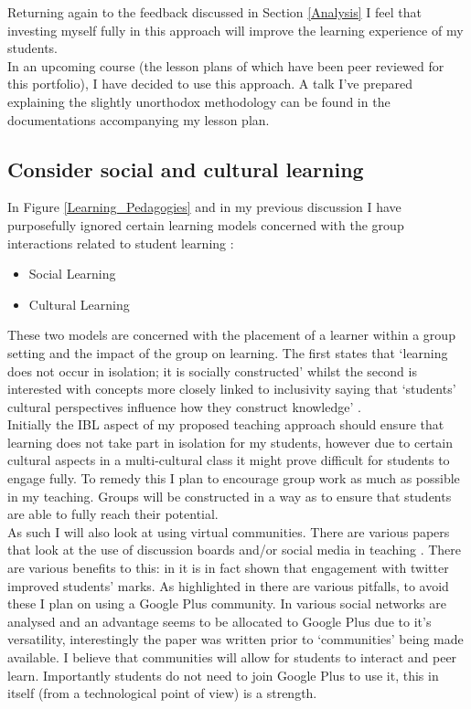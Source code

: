\documentclass[a4paper,12pt]{article}
\begin{document}
Returning again to the feedback discussed in Section \ref{Analysis} I feel that investing myself fully in this approach will improve the learning experience of my students.\\

In an upcoming course (the lesson plans of which have been peer reviewed for this portfolio), I have decided to use this approach. A talk I've prepared explaining the slightly unorthodox methodology can be found in the documentations accompanying my lesson plan.\\

\subsection{Consider social and cultural learning}

In Figure \ref{Learning_Pedagogies} and in my previous discussion I have purposefully ignored certain learning models concerned with the group interactions related to student learning \cite{Jordan2008a}:

\begin{itemize}
    \item Social Learning
    \item Cultural Learning
\end{itemize}

These two models are concerned with the placement of a learner within a group setting and the impact of the group on learning. The first states that `learning does not occur in isolation; it is socially constructed' whilst the second is interested with concepts more closely linked to inclusivity saying that `students' cultural perspectives influence how they construct knowledge' \cite{Jordan2008a}.\\

Initially the IBL aspect of my proposed teaching approach should ensure that learning does not take part in isolation for my students, however due to certain cultural aspects in a multi-cultural class it might prove difficult for students to engage fully. To remedy this I plan to encourage group work as much as possible in my teaching. Groups will be constructed in a way as to ensure that students are able to fully reach their potential.\\

As such I will also look at using virtual communities. There are various papers that look at the use of discussion boards and/or social media in teaching \cite{Gannod2012,Horstmanshof}. There are various benefits to this: in \cite{Junco2011} it is in fact shown that engagement with twitter improved students' marks.  As highlighted in \cite{Wilkinson2011} there are various pitfalls, to avoid these I plan on using a Google Plus community. In \cite{Gannod2012} various social networks are analysed and an advantage seems to be allocated to Google Plus due to it's versatility, interestingly the paper was written prior to `communities' being made available. I believe that communities will allow for students to interact and peer learn. Importantly students do not need to join Google Plus to use it, this in itself (from a technological point of view) is a strength.
\end{document}
